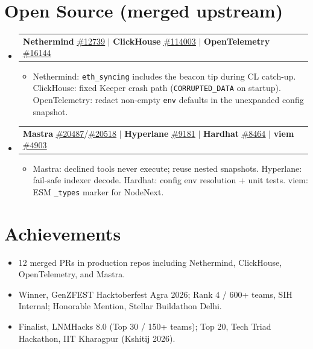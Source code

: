 \documentclass[letterpaper,11pt]{article}
\makeatletter
\newcommand{\resumeItem}[1]{
  \item\small{
    {#1 \vspace{-5pt}}
  }
}
\newcommand{\resumeProjectHeading}[2]{
  \item
    \begin{tabular*}{0.97\textwidth}{l@{\extracolsep{\fill}}r}
      \small#1 & #2 \\
    \end{tabular*}\vspace{-9pt}
}
\newcommand{\resumeSubHeadingListStart}{\begin{itemize}[leftmargin=0.15in, label={}]}
\newcommand{\resumeSubHeadingListEnd}{\end{itemize}}
\newcommand{\resumeItemListStart}{\begin{itemize}}
\newcommand{\resumeItemListEnd}{\end{itemize}\vspace{-10pt}}
\makeatother
\begin{document}
\section{Open Source (merged upstream)}
  \resumeSubHeadingListStart
    \resumeProjectHeading
      {\textbf{Nethermind} \href{https://github.com/NethermindEth/nethermind/pull/12739}{\underline{\#12739}} $|$ \textbf{ClickHouse} \href{https://github.com/ClickHouse/ClickHouse/pull/114003}{\underline{\#114003}} $|$ \textbf{OpenTelemetry} \href{https://github.com/open-telemetry/opentelemetry-collector/pull/16144}{\underline{\#16144}}}{}
      \resumeItemListStart
        \resumeItem{Nethermind: \texttt{eth\_syncing} includes the beacon tip during CL catch-up. ClickHouse: fixed Keeper crash path (\texttt{CORRUPTED\_DATA} on startup). OpenTelemetry: redact non-empty \texttt{env} defaults in the unexpanded config snapshot.}
      \resumeItemListEnd
    \resumeProjectHeading
      {\textbf{Mastra} \href{https://github.com/mastra-ai/mastra/pull/20487}{\underline{\#20487}}/\href{https://github.com/mastra-ai/mastra/pull/20518}{\underline{\#20518}} $|$ \textbf{Hyperlane} \href{https://github.com/hyperlane-xyz/hyperlane-monorepo/pull/9181}{\underline{\#9181}} $|$ \textbf{Hardhat} \href{https://github.com/NomicFoundation/hardhat/pull/8464}{\underline{\#8464}} $|$ \textbf{viem} \href{https://github.com/wevm/viem/pull/4903}{\underline{\#4903}}}{}
      \resumeItemListStart
        \resumeItem{Mastra: declined tools never execute; reuse nested snapshots. Hyperlane: fail-safe indexer decode. Hardhat: config env resolution + unit tests. viem: ESM \texttt{\_types} marker for NodeNext.}
      \resumeItemListEnd
  \resumeSubHeadingListEnd

\section{Achievements}
  \begin{itemize}[leftmargin=0.15in]
    \resumeItem{12 merged PRs in production repos including Nethermind, ClickHouse, OpenTelemetry, and Mastra.}
    \resumeItem{Winner, GenZFEST Hacktoberfest Agra 2026; Rank 4 / 600+ teams, SIH Internal; Honorable Mention, Stellar Buildathon Delhi.}
    \resumeItem{Finalist, LNMHacks 8.0 (Top 30 / 150+ teams); Top 20, Tech Triad Hackathon, IIT Kharagpur (Kshitij 2026).}
  \end{itemize}
\end{document}
